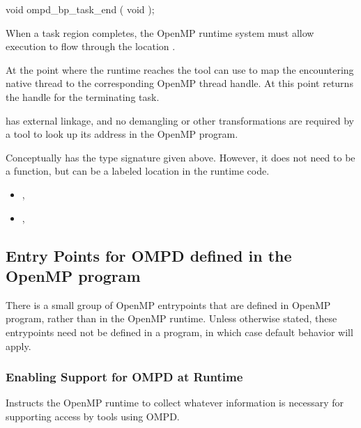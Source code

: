 \cspecificstart
\begin{ompSyntax}
void ompd_bp_task_end ( void );
\end{ompSyntax}
\cspecificend


\descr

When a task region completes, the OpenMP runtime system
must allow execution to flow through the location .

At the point where the runtime reaches 
the tool can use
to map the encountering native thread to the corresponding
OpenMP thread handle.
At this point 
returns the handle for the terminating task.

\restrictions

 has external  linkage, and no
demangling or other transformations are required by a tool
to look up its address in the OpenMP program.

Conceptually  has the type signature
given above.
However, it does not need to be a function, but can be a labeled location
in the runtime code.

\crossreferences
\begin{itemize}
\item
  , 
\item
  , 
\end{itemize}


\subsection{Entry Points for OMPD defined in the OpenMP program}

There is a small group of OpenMP entrypoints that are defined in
OpenMP program, rather than in the OpenMP runtime.
Unless otherwise stated, these entrypoints need not be defined
in a program, in which case default behavior will apply.

\subsubsection{Enabling Support for OMPD at Runtime}
\label{ompd:ompd_enable}

\summary
Instructs the OpenMP runtime to collect whatever information
is necessary for supporting access by tools using OMPD.


